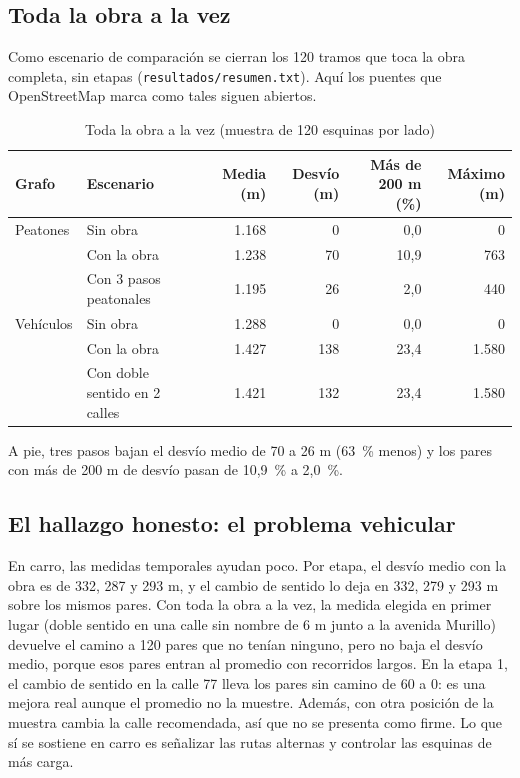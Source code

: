 \documentclass[12pt,letterpaper]{article}
\begin{document}
\subsection{Toda la obra a la vez}
Como escenario de comparación se cierran los 120 tramos que toca la obra completa, sin etapas (\texttt{resultados/resumen.txt}). Aquí los puentes que OpenStreetMap marca como tales siguen abiertos.

\begin{table}[H]
\centering
\caption{Toda la obra a la vez (muestra de 120 esquinas por lado)}
\label{tab:total}
\begin{tabular}{@{}llrrrr@{}}
\toprule
Grafo & Escenario & Media (m) & Desvío (m) & Más de 200 m (\%) & Máximo (m)\\
\midrule
Peatones & Sin obra & 1.168 & 0 & 0,0 & 0\\
 & Con la obra & 1.238 & 70 & 10,9 & 763\\
 & Con 3 pasos peatonales & 1.195 & 26 & 2,0 & 440\\
\midrule
Vehículos & Sin obra & 1.288 & 0 & 0,0 & 0\\
 & Con la obra & 1.427 & 138 & 23,4 & 1.580\\
 & Con doble sentido en 2 calles & 1.421 & 132 & 23,4 & 1.580\\
\bottomrule
\end{tabular}
\end{table}

A pie, tres pasos bajan el desvío medio de 70 a 26 m (63~\% menos) y los pares con más de 200 m de desvío pasan de 10,9~\% a 2,0~\%.

\subsection{El hallazgo honesto: el problema vehicular}
En carro, las medidas temporales ayudan poco. Por etapa, el desvío medio con la obra es de 332, 287 y 293 m, y el cambio de sentido lo deja en 332, 279 y 293 m sobre los mismos pares. Con toda la obra a la vez, la medida elegida en primer lugar (doble sentido en una calle sin nombre de 6 m junto a la avenida Murillo) devuelve el camino a 120 pares que no tenían ninguno, pero no baja el desvío medio, porque esos pares entran al promedio con recorridos largos. En la etapa 1, el cambio de sentido en la calle 77 lleva los pares sin camino de 60 a 0: es una mejora real aunque el promedio no la muestre. Además, con otra posición de la muestra cambia la calle recomendada, así que no se presenta como firme. Lo que sí se sostiene en carro es señalizar las rutas alternas y controlar las esquinas de más carga.
\end{document}
